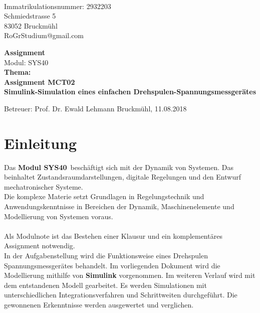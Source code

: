 \documentclass[12pt,a4paper]{scrartcl}	%
\begin{document}
\begin{titlepage}
	\\
	Immatrikulationsnummer:	2932203\\
	Schmiedstrasse 5\\
	83052 Bruckmühl\\
	RoGrStudium@gmail.com\\
	\vspace{5cm}
	
	\begin{center}
		{\Huge \textbf{Assignment} }\\ 
		Modul: SYS40\\
		\vspace{1cm}
		\textbf{Thema:}\\
		\textbf{\large{Assignment MCT02}}\\
		\textbf{Simulink-Simulation eines einfachen Drehspulen-Spannungsmessgerätes}\\
		
	\end{center}
	
	\vspace{6cm}
	Betreuer: Prof. Dr. Ewald Lehmann
	\vfill Bruckmühl, 11.08.2018

\end{titlepage}
\newpage
\tableofcontents
\newpage
\clearpage
\thispagestyle{empty}
\listoffigures
\newpage

\clearpage
\thispagestyle{empty}
\newpage

\setcounter{page}{1}
\section{Einleitung}
Das \textbf{Modul SYS40}~beschäftigt sich mit der Dynamik von Systemen. Das beinhaltet Zustandsraumdarstellungen, digitale Regelungen und den Entwurf mechatronischer Systeme.\\
Die komplexe Materie setzt Grundlagen in Regelungstechnik und Anwendungskenntnisse in Bereichen der Dynamik, Maschinenelemente und Modellierung von Systemen voraus.\\
\\
Als Modulnote ist das Bestehen einer Klausur und ein komplementäres Assignment notwendig.\\
In der Aufgabenstellung wird die Funktionsweise eines Drehspulen Spannungsmessgerätes behandelt. Im vorliegenden Dokument wird die Modellierung mithilfe von \textbf{Simulink} vorgenommen. Im weiteren Verlauf wird mit dem entstandenen Modell gearbeitet. Es werden Simulationen mit unterschiedlichen Integrationsverfahren und Schrittweiten durchgeführt. Die gewonnenen Erkenntnisse werden ausgewertet und verglichen.\\
\end{document}
